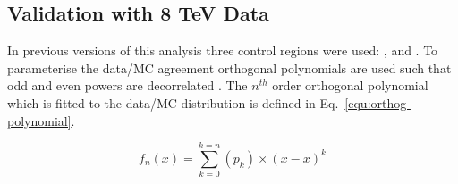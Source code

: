 
\subsection{Validation with 8 TeV Data}
\label{sec:valid8}
In previous versions of this analysis three control regions
were used: \mj, \mmj and \gj. To parameterise the data/MC agreement
orthogonal polynomials are used such that odd and even powers 
are decorrelated \cite{cohen2013applied}. 
The $n^{th}$ order orthogonal polynomial which is fitted to the data/MC 
distribution is defined in Eq.~\ref{equ:orthog-polynomial}.

\begin{equation}
  \label{equ:orthog-polynomial}
  f_n(x) = \sum_{k=0}^{k=n}{(p_k)\times(\bar{x}-x)^k}
\end{equation}

